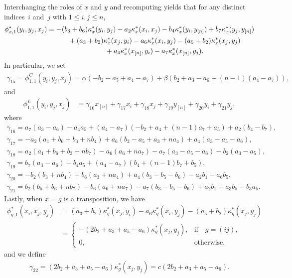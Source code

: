 \documentclass[10pt,a4paper]{amsart}
\numberwithin{equation}{section}
\begin{document}
Interchanging the roles of $x$ and $y$ and recomputing %
yields that for any distinct indices~$i$ and~$j$ with $1 \leq i, j \leq n$,
\begin{gather*}
\phi_{x,1}^*(y_i,y_j,x_j)
=-(b_3+b_6) \kappa^*_x(y_i,y_j) - a_2 \kappa^*_x(x_i,x_j) - b_4 \kappa^*_x(y_i,y_{[n]}) + b_7 \kappa^*_x(y_j,y_{[n]})
\\ \hphantom{\phi_{x,1}^*(y_i,y_j,x_j)=}
{}+(a_3+b_2) \kappa^*_x(x_j,y_i) - a_6 \kappa^*_x(x_i,y_j) - (a_5+b_2) \kappa^*_x(x_j,y_j)
\\ \hphantom{\phi_{x,1}^*(y_i,y_j,x_j)=}
{}+ a_4 \kappa^*_x(x_{[n]},y_i) - a_7 \kappa^*_x(x_{[n]},y_j).
\end{gather*}
In particular, we set
\begin{gather*}
\gamma_{15}=\phi_{1,1}^C(y_i,y_j,x_j)=\alpha(-b_2-a_5+a_4-a_7)+\beta(b_2+a_3-a_6+(n-1)(a_4-a_7)),
\end{gather*}
 and
\begin{align*}
\phi_{1,1}^L(y_i,y_j,x_j)
&=\gamma_{16} x_{[n]} +\gamma_{17} x_i +\gamma_{18} x_j +\gamma_{19}y_{[n]} +\gamma_{20}y_i +\gamma_{21}y_j,
\end{align*}
where
\begin{gather*}
\gamma_{16}=a_7(a_3 - a_6) - a_4 a_5 + (a_4-a_7)(-b_2 + a_4 + (n-1)a_7 + a_5) + a_2(b_4 - b_7), \\
\gamma_{17}=-a_2(a_1 + b_6 + b_3 + nb_4) + a_6(b_2 - a_5 + a_3 + na_4) + a_4(a_3 - a_5 - a_6), \\
\gamma_{18}=a_2(a_1 + b_6 + b_3 + nb_7) - a_6(a_6 + na_7) - a_7(a_3 - a_5 - a_6) - b_2(a_3 - a_5), \\
\gamma_{19}=b_7(a_3 - a_6) - b_4 a_5 + (a_4 - a_7)(b_4 + (n-1) b_7 + b_5), \\
\gamma_{20}=-b_2(b_3 + nb_4) + b_6(a_3 + na_4) + a_4(b_3 - b_5 - b_6) - a_2 b_1 - a_6 b_5, \\
\gamma_{21}=b_2(b_5 + b_6 + nb_7) - b_6(a_6 + na_7) - a_7(b_3 - b_5 - b_6) + a_2 b_1 + a_3 b_5 - b_3 a_5.
\end{gather*}
Lastly, when $x=g$ is a transposition, we have
\begin{align*}
\phi_{g,1}^*(x_i,x_j,y_j)&=(a_3 + b_2)\kappa^*_g(x_j,y_i) - a_6\kappa^*_g(x_i,y_j) - (a_5 + b_2)\kappa^*_g(x_j,y_j) \\
&=
\begin{cases}
 -(2b_2 + a_3 + a_5 - a_6)\kappa^*_g(x_j,y_j), & \text{if}\quad g=(ij), \\
 0, & \text{otherwise,}
\end{cases}
\end{align*}
and we define
\begin{gather*}
\gamma_{22}=(2b_2 + a_3 + a_5 - a_6)\kappa^*_g(x_j,y_j)=c(2b_2 + a_3 + a_5 - a_6).
\end{gather*}
\end{document}
